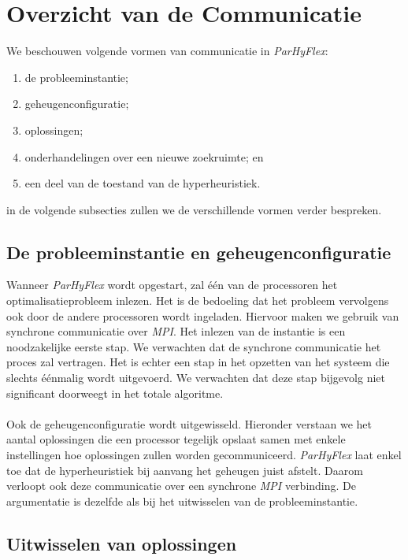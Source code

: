 \section{Overzicht van de Communicatie}

We beschouwen volgende vormen van communicatie in \emph{ParHyFlex}:
\begin{enumerate}
 \item de probleeminstantie;
 \item geheugenconfiguratie;
 \item oplossingen;
 \item onderhandelingen over een nieuwe zoekruimte; en
 \item een deel van de toestand van de hyperheuristiek.
\end{enumerate}
in de volgende subsecties zullen we de verschillende vormen verder bespreken.

\subsection{De probleeminstantie en geheugenconfiguratie}

Wanneer \emph{ParHyFlex} wordt opgestart, zal \'e\'en van de processoren het optimalisatieprobleem inlezen. Het is de bedoeling dat het probleem vervolgens ook door de andere processoren wordt ingeladen. Hiervoor maken we gebruik van synchrone communicatie over \emph{MPI}. Het inlezen van de instantie is een noodzakelijke eerste stap. We verwachten dat de synchrone communicatie het proces zal vertragen. Het is echter een stap in het opzetten van het systeem die slechts \'e\'enmalig wordt uitgevoerd. We verwachten dat deze stap bijgevolg niet significant doorweegt in het totale algoritme.

\paragraph{}
Ook de geheugenconfiguratie wordt uitgewisseld. Hieronder verstaan we het aantal oplossingen die een processor tegelijk opslaat samen met enkele instellingen hoe oplossingen zullen worden gecommuniceerd. \emph{ParHyFlex} laat enkel toe dat de hyperheuristiek bij aanvang het geheugen juist afstelt. Daarom verloopt ook deze communicatie over een synchrone \emph{MPI} verbinding. De argumentatie is dezelfde als bij het uitwisselen van de probleeminstantie.

\subsection{Uitwisselen van oplossingen}

